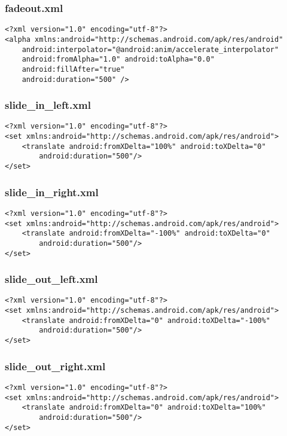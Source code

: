 \subsubsection*{fadeout.xml}
\begin{lstlisting}
<?xml version="1.0" encoding="utf-8"?>
<alpha xmlns:android="http://schemas.android.com/apk/res/android"
    android:interpolator="@android:anim/accelerate_interpolator"
    android:fromAlpha="1.0" android:toAlpha="0.0"
    android:fillAfter="true"
    android:duration="500" />
\end{lstlisting}

\subsubsection*{slide\_in\_left.xml}
\begin{lstlisting}
<?xml version="1.0" encoding="utf-8"?>
<set xmlns:android="http://schemas.android.com/apk/res/android">
    <translate android:fromXDelta="100%" android:toXDelta="0"
        android:duration="500"/>
</set>
\end{lstlisting}

\subsubsection*{slide\_in\_right.xml}
\begin{lstlisting}
<?xml version="1.0" encoding="utf-8"?>
<set xmlns:android="http://schemas.android.com/apk/res/android">
    <translate android:fromXDelta="-100%" android:toXDelta="0"
        android:duration="500"/>
</set>
\end{lstlisting}

\subsubsection*{slide\_out\_left.xml}
\begin{lstlisting}
<?xml version="1.0" encoding="utf-8"?>
<set xmlns:android="http://schemas.android.com/apk/res/android">
    <translate android:fromXDelta="0" android:toXDelta="-100%"
        android:duration="500"/>
</set>
\end{lstlisting}

\subsubsection*{slide\_out\_right.xml}
\begin{lstlisting}
<?xml version="1.0" encoding="utf-8"?>
<set xmlns:android="http://schemas.android.com/apk/res/android">
    <translate android:fromXDelta="0" android:toXDelta="100%"
        android:duration="500"/>
</set>
\end{lstlisting}

